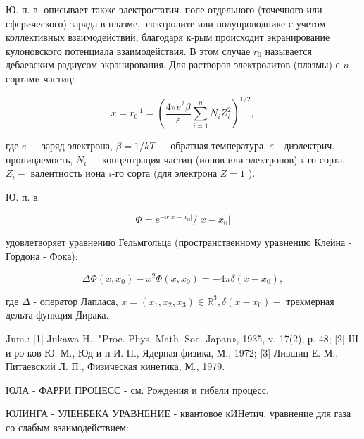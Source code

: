 \documentclass[10pt]{article}
\begin{document}
Ю. п. в. описывает также электростатич. поле отдельного (точечного или сферического) заряда в плазме, электролите или полупроводнике с учетом коллективных взаимодействий, благодаря к-рым происходит экранирование кулоновского потенциала взаимодействия. В этом случае $r_{0}$ называется дебаевским радиусом экранирования. Для растворов электролитов (плазмы) с $n$ сортами частиц:



\[

x=r_{0}^{-1}=\left(\frac{4 \pi e^{2} \beta}{\varepsilon} \sum_{i=1}^{n} N_{i} Z_{i}^{2}\right)^{1 / 2},

\]



где $e-$ заряд электрона, $\beta=1 / k T-$ обратная температура, $\varepsilon$ - диэлектрич. проницаемость, $N_{i}-$ концентрация частиц (ионов или электронов) $i$-го сорта, $Z_{i}-$ валентность иона $i$-го сорта (для электрона $Z=1$ ).



Ю. п. в.



\[

\Phi=e^{-x\left|x-x_{0}\right|} /\left|x-x_{0}\right|

\]



удовлетворяет уравнению Гельмгольца (пространственному уравнению Клейна - Гордона - Фока):



\[

\Delta \Phi\left(x, x_{0}\right)-x^{2} \Phi\left(x, x_{0}\right)=-4 \pi \delta\left(x-x_{0}\right),

\]



где $\Delta$ - оператор Лапласа, $x=\left(x_{1}, x_{2}, x_{3}\right) \in \mathbb{R}^{3}, \delta\left(x-x_{0}\right)-$ трехмерная дельта-функция Дирака.



Jum.: [1] Jukawa H., "Proc. Phys. Math. Soc. Japan», 1935, v. 17(2), р. 48; [2] Ш и ро ков Ю. М., Юд и н И. П., Ядерная физика, М., 1972; [3] Лившиц Е. М., Питаевский Л. П., Физическая кинетика, М., 1979.



ЮЛА - ФАРРИ ПРОЦЕСС - см. Рождения и гибели процесс.



ЮЛИНГА - УЛЕНБЕКА УРАВНЕНИЕ - квантовое кИНетич. уравнение для газа со слабым взаимодействием:
\end{document}
